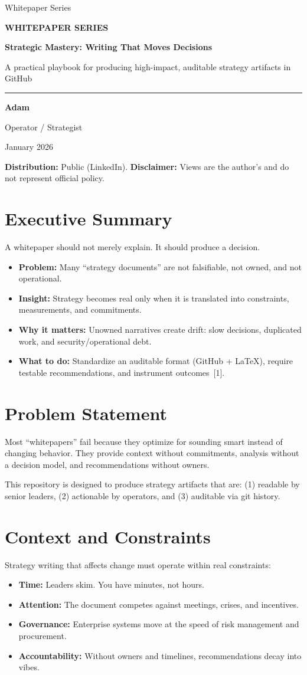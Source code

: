 \documentclass[11pt]{article}
\newcommand{\brandlogo}{%
  \textcolor{BrandAccent}{\textbf{WHITEPAPER SERIES}}%
}
\newenvironment{execsummary}{
  \section*{Executive Summary}
  \addcontentsline{toc}{section}{Executive Summary}
  \vspace{-2pt}
  \color{black}
}{\vspace{6pt}}
\newcommand{\PaperTitle}{Strategic Mastery: Writing That Moves Decisions}
\newcommand{\PaperSubtitle}{A practical playbook for producing high-impact, auditable strategy artifacts in GitHub}
\newcommand{\AuthorName}{Adam}
\newcommand{\AuthorRole}{Operator / Strategist}
\newcommand{\PaperDate}{January 2026}
\newcommand{\SeriesTag}{Whitepaper Series}
\newcommand{\maketitlepage}{
  \thispagestyle{empty}
  \vspace*{0.6in}

  \noindent
  \begin{minipage}[t]{0.65\textwidth}
    \textcolor{BrandGray}{\small \SeriesTag}
  \end{minipage}
  \begin{minipage}[t]{0.35\textwidth}
    \raggedleft
    \textcolor{BrandGray}{\small \brandlogo}
  \end{minipage}

  \vspace{0.35in}

  {\Huge\bfseries\color{BrandAccent}\PaperTitle\par}
  \vspace{0.12in}
  {\large\color{BrandGray}\PaperSubtitle\par}
  \vspace{0.25in}

  \noindent\textcolor{RuleGray}{\rule{\textwidth}{0.8pt}}
  \vspace{0.2in}

  {\normalsize
    \textbf{\AuthorName}\par
    \textcolor{BrandGray}{\AuthorRole}\par
    \vspace{6pt}
    \textcolor{BrandGray}{\PaperDate}\par
  }

  \vfill

  \noindent\textcolor{BrandGray}{\small
    \textbf{Distribution:} Public (LinkedIn).\quad
    \textbf{Disclaimer:} Views are the author's and do not represent official policy.
  }
  \newpage
}
\begin{document}
\maketitlepage


\begin{execsummary}
  A whitepaper should not merely explain. It should produce a decision.

  \begin{itemize}
    \item \textbf{Problem:} Many “strategy documents” are not falsifiable, not owned, and not operational.
    \item \textbf{Insight:} Strategy becomes real only when it is translated into constraints, measurements, and commitments.
    \item \textbf{Why it matters:} Unowned narratives create drift: slow decisions, duplicated work, and security/operational debt.
    \item \textbf{What to do:} Standardize an auditable format (GitHub + LaTeX), require testable recommendations, and instrument outcomes \,[1].
  \end{itemize}
\end{execsummary}

\section{Problem Statement}
Most “whitepapers” fail because they optimize for sounding smart instead of changing behavior. They provide context without commitments, analysis without a decision model, and recommendations without owners.

This repository is designed to produce strategy artifacts that are: (1) readable by senior leaders, (2) actionable by operators, and (3) auditable via git history.

\section{Context and Constraints}
Strategy writing that affects change must operate within real constraints:
\begin{itemize}
  \item \textbf{Time:} Leaders skim. You have minutes, not hours.
  \item \textbf{Attention:} The document competes against meetings, crises, and incentives.
  \item \textbf{Governance:} Enterprise systems move at the speed of risk management and procurement.
  \item \textbf{Accountability:} Without owners and timelines, recommendations decay into vibes.
\end{itemize}
\end{document}
